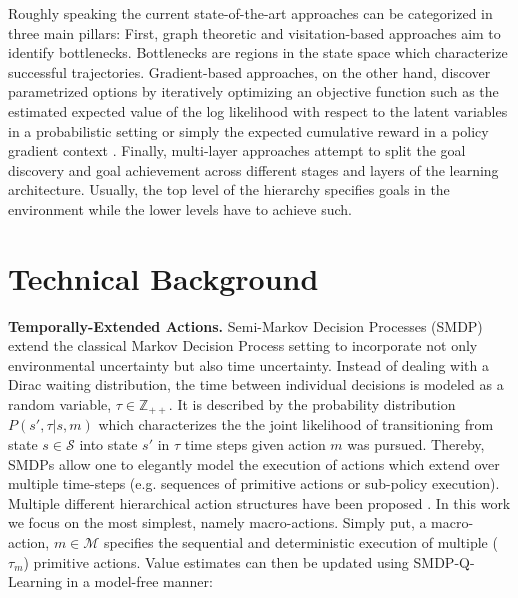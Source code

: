 \documentclass[colorinlistoftodos]{article}
\theoremstyle{definition}
\begin{document}
Roughly speaking the current state-of-the-art approaches can be categorized in three main pillars:
First, graph theoretic \citep{Hengst_2002, Menache_2002, Mannor_2004, Simsek_2004b} and visitation-based \citep{Mcgovern_2001, Stolle_2002, Simsek_2004b} approaches aim to identify bottlenecks. Bottlenecks are regions in the state space which characterize successful trajectories.
Gradient-based approaches, on the other hand, discover parametrized options by iteratively optimizing an objective function such as the estimated expected value of the log likelihood with respect to the latent variables in a probabilistic setting \citep{Daniel_2016} or simply the expected cumulative reward in a policy gradient context \citep{Bacon_2017, Smith_2018}.
Finally, multi-layer \citep{Bakker_2004, Vezhnevets_2017, Florensa_2017} approaches attempt to split the goal discovery and goal achievement across different stages and layers of the learning architecture. Usually, the top level of the hierarchy specifies goals in the environment while the lower levels have to achieve such.

\newpage
\section{Technical Background}

\textbf{Temporally-Extended Actions.} Semi-Markov Decision Processes (SMDP) extend the classical Markov Decision Process setting to incorporate not only environmental uncertainty but also time uncertainty. Instead of dealing with a Dirac waiting distribution, the time between individual decisions is modeled as a random variable, $\tau \in \mathbb{Z}_{++}$. It is described by the probability distribution $P(s', \tau| s, m)$  which characterizes the the joint likelihood of transitioning from state $s \in \mathcal{S}$ into state $s'$ in $\tau$ time steps given action $m$ was pursued. Thereby, SMDPs allow one to elegantly model the execution of actions which extend over multiple time-steps (e.g. sequences of primitive actions or sub-policy execution). Multiple different hierarchical action structures have been proposed \citep{McGovern_1997, Sutton_1999, Parr_1998b, Dayan_1993}. In this work we focus on the most simplest, namely macro-actions. Simply put, a macro-action, $m \in \mathcal{M}$ specifies the sequential and deterministic execution of multiple ($\tau_m$) primitive actions. Value estimates can then be updated using SMDP-Q-Learning \citep{Parr_1998a} in a model-free manner:
\end{document}
